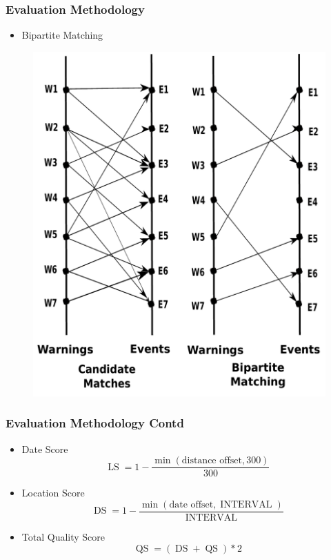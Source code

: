\documentclass{beamer}
\begin{document}
\begin{frame}
\frametitle{Evaluation Methodology}
    \begin{itemize}
        \item
            Bipartite Matching
    \end{itemize}
    \begin{figure}
        \includegraphics[height=0.7\textheight]{matching}
    \end{figure}

\end{frame}


\begin{frame}
    \frametitle{Evaluation Methodology Contd}
    \begin{itemize}
        \item
            Date Score
            \begin{equation}
                \operatorname{LS}=1 - \frac{\min(\textrm{distance offset}, 300)}{300}
            \end{equation}
        \item
            Location Score
            \begin{equation}
                \operatorname{DS}=1 - \frac{\min(\textrm{date offset}, \operatorname{INTERVAL})}{\operatorname{INTERVAL}}
            \end{equation}

        \item
            Total Quality Score
            \begin{equation}
                \operatorname{QS}=(\operatorname{DS} + \operatorname{QS})*2
            \end{equation}


    \end{itemize}

\end{frame}
\end{document}
